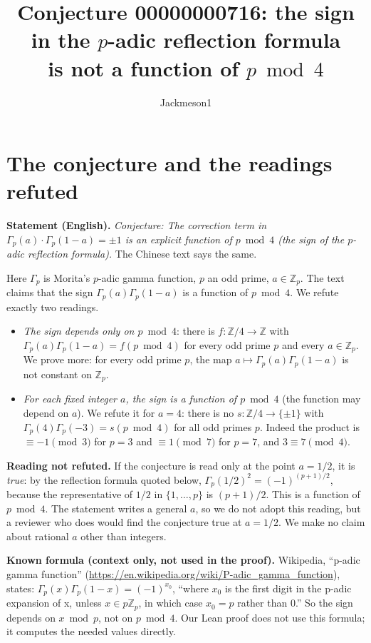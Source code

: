 \documentclass[11pt]{article}
\title{Conjecture 00000000716: the sign in the $p$-adic reflection formula\\ is not a function of $p \bmod 4$}
\author{Jackmeson1}
\date{}
\theoremstyle{definition}
\newcommand{\Zp}{\mathbb{Z}_p}
\begin{document}
\maketitle

\section{The conjecture and the readings refuted}

\textbf{Statement (English).} \emph{Conjecture: The correction term in
$\Gamma_p(a)\cdot\Gamma_p(1-a) = \pm 1$ is an explicit function of $p \bmod 4$ (the sign of the
$p$-adic reflection formula).} The Chinese text says the same.

Here $\Gamma_p$ is Morita's $p$-adic gamma function, $p$ an odd prime, $a \in \Zp$. The text claims
that the sign $\Gamma_p(a)\Gamma_p(1-a)$ is a function of $p \bmod 4$. We refute exactly two readings.

\begin{itemize}
\item[(A)] \emph{The sign depends only on $p \bmod 4$}: there is $f : \mathbb{Z}/4 \to \mathbb{Z}$
with $\Gamma_p(a)\Gamma_p(1-a) = f(p \bmod 4)$ for every odd prime $p$ and every $a \in \Zp$.
We prove more: for every odd prime $p$, the map $a \mapsto \Gamma_p(a)\Gamma_p(1-a)$ is not
constant on $\Zp$.
\item[(B)] \emph{For each fixed integer $a$, the sign is a function of $p \bmod 4$}
(the function may depend on $a$). We refute it for $a = 4$: there is no
$s : \mathbb{Z}/4 \to \{\pm 1\}$ with $\Gamma_p(4)\Gamma_p(-3) = s(p \bmod 4)$ for all odd primes $p$.
Indeed the product is $\equiv -1 \pmod 3$ for $p = 3$ and $\equiv 1 \pmod 7$ for $p = 7$, and
$3 \equiv 7 \pmod 4$.
\end{itemize}

\textbf{Reading not refuted.} If the conjecture is read only at the point $a = 1/2$, it is
\emph{true}: by the reflection formula quoted below, $\Gamma_p(1/2)^2 = (-1)^{(p+1)/2}$, because
the representative of $1/2$ in $\{1,\dots,p\}$ is $(p+1)/2$. This is a function of
$p \bmod 4$. The statement writes a general $a$, so we do not adopt this reading, but a reviewer
who does would find the conjecture true at $a = 1/2$. We make no claim about rational $a$ other
than integers.

\textbf{Known formula (context only, not used in the proof).} Wikipedia, ``p-adic gamma
function'' (\url{https://en.wikipedia.org/wiki/P-adic_gamma_function}), states:
$\Gamma_p(x)\Gamma_p(1-x) = (-1)^{x_0}$, ``where $x_0$ is the first digit in the p-adic
expansion of x, unless $x \in p\mathbb{Z}_p$, in which case $x_0 = p$ rather than 0.''
So the sign depends on $x \bmod p$, not on $p \bmod 4$. Our Lean proof does not use this formula;
it computes the needed values directly.
\end{document}
